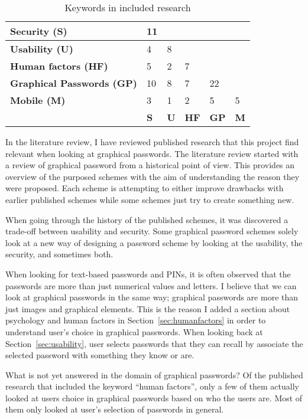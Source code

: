   \begin{table}[H]
      \centering
      \begin{tabular}{| p{4.7cm} | p{1cm} | p{1cm} | p{1cm} | p{1cm} | p{1cm} |}
        \hline
        {\bf Security (S)} & 11 & & & & \\ \hline
        {\bf Usability (U)} & 4 & 8 & & & \\ \hline
        {\bf Human factors (HF)} & 5 & 2 & 7 & & \\ \hline
        {\bf Graphical Passwords (GP)} & 10 & 8 & 7 & 22 & \\ \hline
        {\bf Mobile (M)} & 3 & 1 & 2 & 5 & 5 \\ \hline
         & {\bf S} & {\bf U} & {\bf HF} & {\bf GP} & {\bf M} \\ \hline
      \end{tabular}
      \caption{Keywords in included research}
      \label{tab:frequencyKeywords}
    \end{table}
    
  In the literature review, I have reviewed published research that this project find relevant when looking at graphical passwords. The literature review started with a review of graphical password from a historical point of view. This provides an overview of the purposed schemes with the aim of understanding the reason they were proposed. Each scheme is attempting to either improve drawbacks with earlier published schemes while some schemes just try to create something new.

  When going through the history of the published schemes, it was discovered a trade-off between usability and security. Some graphical password schemes solely look at a new way of designing a password scheme by looking at the usability, the security, and sometimes both.

  When looking for text-based passwords and PINs, it is often observed that the passwords are more than just numerical values and letters. I believe that we can look at graphical passwords in the same way; graphical passwords are more than just images and graphical elements. This is the reason I added a section about psychology and human factors in Section~\ref{sec:humanfactors} in order to understand user's choice in graphical passwords. When looking back at Section~\ref{sec:usability}, user selects passwords that they can recall by associate the selected password with something they know or are.

  What is not yet answered in the domain of graphical passwords? Of the published research that included the keyword ``human factors'', only a few of them actually looked at users choice in graphical passwords based on who the users are. Most of them only looked at user's selection of passwords in general.

